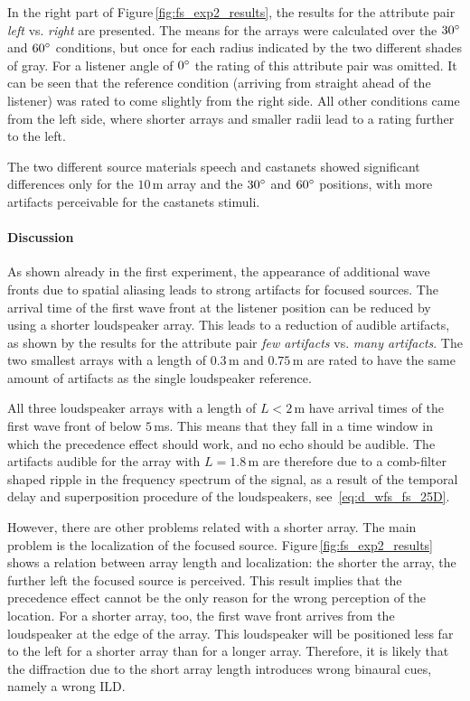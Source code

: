 In the right part of Figure\,\ref{fig:fs_exp2_results}, the results for the
attribute pair \emph{left} vs. \emph{right} are presented. The means for
the arrays were calculated over the $30^\circ$ and $60^\circ$ conditions,
but once for each radius indicated by the two different shades of gray. For a
listener angle of $0^\circ$ the rating of this attribute pair was omitted.
It can be seen that the reference condition (arriving from straight ahead
of the listener) was rated to come slightly from the right side. All other
conditions came from the left side, where shorter arrays and smaller radii
lead to a rating further to the left.

The two different source materials speech and castanets showed significant
differences only for the $10$\,m array and the $30^\circ$ and $60^\circ$
positions, with more artifacts perceivable for the castanets stimuli.


\paragraph{Discussion}
As shown already in the first experiment, the appearance of additional wave
fronts due to spatial aliasing leads to strong artifacts for focused sources.
The arrival time of the first wave front at the
listener position can be reduced by using a shorter loudspeaker array.  This
leads to a reduction of audible artifacts, as shown by the results for the
attribute pair \emph{few artifacts} vs. \emph{many artifacts}.  The two smallest
arrays with a length of $0.3$\,m and $0.75$\,m are rated to have the same amount
of artifacts as the single loudspeaker reference.

All three loudspeaker arrays with a length of $L<2$\,m have arrival times of the
first wave front of below $5$\,ms. This means that they fall in a time window in
which the precedence effect should work, and no echo should be audible.  The
artifacts audible for the array with $L = 1.8$\,m are therefore due to a
comb-filter shaped ripple in the frequency spectrum of the signal, as a result
of the temporal delay and superposition procedure of the loudspeakers,
see~\eqref{eq:d_wfs_fs_25D}.

However, there are other problems related with a shorter array.  The main
problem is the localization of the focused source.
Figure\,\ref{fig:fs_exp2_results} shows a relation between array length
and localization: the shorter the array, the further left the focused source
is perceived.  This result implies that the precedence effect cannot be the only
reason for the wrong perception of the location. For a shorter array, too, the
first wave front arrives from the loudspeaker at the edge of the array. This
loudspeaker will be positioned less far to the left for a shorter array than for
a longer array.  Therefore, it is likely that the diffraction due to the short
array length introduces wrong binaural cues, namely a wrong ILD.


